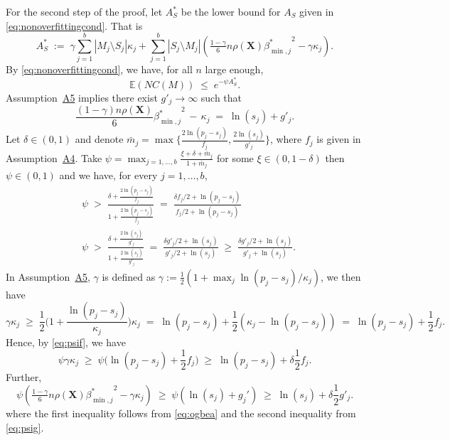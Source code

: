 \documentclass[
  12pt]{article}
\newcommand{\E}{\mathbb{E}}
\newcommand{\bX}{\mathbf{X}}
\begin{document}
For the second step of the proof, let $A_S^*$ be the lower bound for $A_S$ given in \eqref{eq:nonoverfittingcond}. That is 
$$A_S^*\;:=\;\gamma\sum_{j=1}^b|M_j \setminus S_j|\kappa_j + \sum_{j=1}^b |S_j\setminus M_j |\left(\tfrac{1-\gamma}{6} n \rho(\bX) {\beta^*_{\min,j}}^{2} - \gamma\kappa_j\right).$$
By \eqref{eq:nonoverfittingcond}, we have, for all $n$ large enough,
\begin{equation}\label{eq:boundexp}
    \E(NC(M))\;\leq\;e^{-\psi A_S^*}.
\end{equation}
Assumption~\hyperlink{lab:A5}{A5} implies there exist $g'_j \to \infty$ such that
\begin{equation}\label{eq:ogbea}
    \frac{(1-\gamma) n\rho(\bX)}{6}{\beta_{\min,j}^*}^2 \,- \,\kappa_j \;=\; \ln(s_j) + g'_{j}.
\end{equation}
Let $\delta \in (0,1)$ and denote $\bar{m}_j=\max\big\{\frac{2\ln(p_j-s_j)}{f_j},\frac{2\ln(s_j)}{g'_{j}}\big\}$, where $f_j$ is given in Assumption~\hyperlink{lab:A4}{A4}. 
Take $\psi=\max_{j=1,\ldots,b}\frac{\xi + \delta + \bar{m}_j}{1+\bar{m}_j}$ for some $\xi \in(0, 1- \delta)$ then $\psi \in (0,1)$ and we have, for every $j=1,\ldots,b$,
\begin{align}
    &\psi \;>\; \frac{\delta + \frac{2\ln(p_j-s_j)}{f_j}}{1+\frac{2\ln(p_j-s_j)}{f_j}} \;=\; \frac{\delta f_j/2 + \ln(p_j-s_j)}{f_j/2 +\ln(p_j-s_j)} \label{eq:psif}\\
    &\psi \;>\; \frac{\delta + \frac{2\ln(s_j)}{g'_j}}{1+\frac{2\ln(s_j)}{g'_j}} \;=\;  \frac{\delta g'_j/2 + \ln(s_j)}{g'_j/2 +\ln(s_j)} \;\geq\; \frac{\delta g'_j/2 + \ln(s_j)}{g'_j +\ln(s_j)}.\label{eq:psig}
\end{align}
In Assumption~\hyperlink{lab:A5}{A5}, $\gamma$ is defined as $\gamma:=\tfrac12(1+\max_j\ln(p_j-s_j)/\kappa_j)$, we then have 
$$
\gamma\kappa_j\;\geq\;\frac12 \Big(1+\frac{\ln(p_j-s_j)}{\kappa_j}\Big)\kappa_j\;=\;\ln(p_j-s_j)+\frac12(\kappa_j-\ln(p_j-s_j)) \;=\; \ln(p_j-s_j)+ \frac12f_j.
$$
Hence, by \eqref{eq:psif}, we have
\begin{equation}\label{eq:ooofjfj}
\psi\gamma\kappa_j \;\geq\; \psi\big(\ln(p_j-s_j)+ \frac12f_j\big) \;\geq\;  \ln(p_j-s_j)+ \delta\frac12f_j.
\end{equation}
Further,
\begin{equation}\label{eq:ooofjfj2}
\psi\left(\tfrac{1-\gamma}{6} n \rho(\bX) {\beta^*_{\min,j}}^{2} - \gamma\kappa_j\right) \;\geq\; \psi\left(\ln(s_j)+g_j'\right) \;\geq\; \ln(s_j)+\delta \frac{1}{2}g'_j.
\end{equation}
where the first inequality follows from \eqref{eq:ogbea} and the second inequality from \eqref{eq:psig}.
\end{document}
